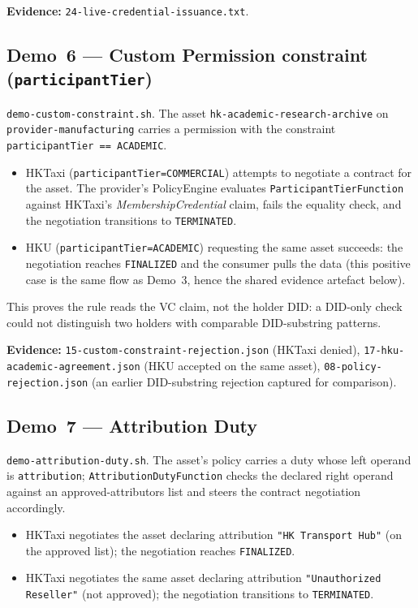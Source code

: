 \documentclass[11pt,a4paper]{article}
\DeclareRobustCommand{\code}[1]{\texttt{\small #1}}
\begin{document}
\noindent\textbf{Evidence:} \code{24-live-credential-issuance.txt}.

\subsection{Demo~6 --- Custom Permission constraint (\code{participantTier})}

\code{demo-custom-constraint.sh}. The asset
\code{hk-academic-research-archive} on \code{provider-manufacturing}
carries a permission with the constraint
\code{participantTier == ACADEMIC}.

\begin{itemize}
  \item HKTaxi (\code{participantTier=COMMERCIAL}) attempts to negotiate
    a contract for the asset. The provider's PolicyEngine evaluates
    \code{ParticipantTierFunction} against HKTaxi's
    \emph{MembershipCredential} claim, fails the equality check, and
    the negotiation transitions to \code{TERMINATED}.
  \item HKU (\code{participantTier=ACADEMIC}) requesting the same asset
    succeeds: the negotiation reaches \code{FINALIZED} and the consumer
    pulls the data (this positive case is the same flow as Demo~3, hence
    the shared evidence artefact below).
\end{itemize}

This proves the rule reads the VC claim, not the holder DID: a DID-only
check could not distinguish two holders with comparable DID-substring
patterns.

\noindent\textbf{Evidence:} \code{15-custom-constraint-rejection.json}
(HKTaxi denied), \code{17-hku-academic-agreement.json} (HKU accepted on
the same asset), \code{08-policy-rejection.json} (an earlier
DID-substring rejection captured for comparison).

\subsection{Demo~7 --- Attribution Duty}
\label{sec:eval-d7}

\code{demo-attribution-duty.sh}. The asset's policy carries a duty
whose left operand is \code{attribution}; \code{AttributionDutyFunction}
checks the declared right operand against an approved-attributors list
and steers the contract negotiation accordingly.

\begin{itemize}
  \item HKTaxi negotiates the asset declaring attribution
    \code{"HK Transport Hub"} (on the approved list); the negotiation
    reaches \code{FINALIZED}.
  \item HKTaxi negotiates the same asset declaring attribution
    \code{"Unauthorized Reseller"} (not approved); the negotiation
    transitions to \code{TERMINATED}.
\end{itemize}
\end{document}
